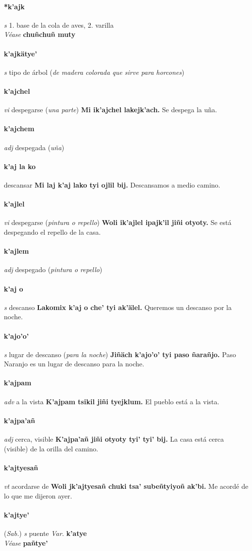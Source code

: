 \documentclass{scrbook}
\newcommand{\entry}[1]{\paragraph{#1}}
\newcommand{\onedefinition}[1]{#1.}
\newcommand{\partofspeech}[1]{\textit{#1}}
\newcommand{\spanishtranslation}[1]{#1}
\newcommand{\clarification}[1]{(\textit{#1})}
\newcommand{\cholexample}[1]{\textbf{#1}}
\newcommand{\exampletranslation}[1]{#1}
\newcommand{\alsosee}[1]{\\\textit{Véase} \textbf{#1}}
\newcommand{\relevantdialect}[1]{(\textit{#1})}
\newcommand{\variation}[1]{\textit{Var.} \textbf{#1}}
\begin{document}
\begin{multicols}{2}
\entry{*k'ajk}
\partofspeech{s}
\onedefinition{1}
\spanishtranslation{base de la cola de aves,}
\onedefinition{2}
\spanishtranslation{varilla}
\alsosee{chuñchuñ muty}

\entry{k'ajkätye'}
\partofspeech{s}
\spanishtranslation{tipo de árbol}
\clarification{de madera colorada que sirve para horcones}

\entry{k'ajchel}
\partofspeech{vi}
\spanishtranslation{despegarse}
\clarification{una parte}
\cholexample{Mi ik'ajchel lakejk'ach.}
\exampletranslation{Se despega la uña.}

\entry{k'ajchem}
\partofspeech{adj}
\spanishtranslation{despegada}
\clarification{uña}

\entry{k'aj la ko}
\spanishtranslation{descansar}
\cholexample{Mi laj k'aj lako tyi ojlil bij.}
\exampletranslation{Descansamos a medio camino.}

\entry{k'ajlel}
\partofspeech{vi}
\spanishtranslation{despegarse}
\clarification{pintura o repello}
\cholexample{Woli ik'ajlel ipajk'il jiñi otyoty.}
\exampletranslation{Se está despegando el repello de la casa.}

\entry{k'ajlem}
\partofspeech{adj}
\spanishtranslation{despegado}
\clarification{pintura o repello}

\entry{k'aj o}
\partofspeech{s}
\spanishtranslation{descanso}
\cholexample{Lakomix k'aj o che' tyi ak'älel.}
\exampletranslation{Queremos un descanso por la noche.}

\entry{k'ajo'o'}
\partofspeech{s}
\spanishtranslation{lugar de descanso}
\clarification{para la noche}
\cholexample{Jiñäch k'ajo'o' tyi paso ñarañjo.}
\exampletranslation{Paso Naranjo es un lugar de descanso para la noche.}

\entry{k'ajpam}
\partofspeech{adv}
\spanishtranslation{a la vista}
\cholexample{K'ajpam tsikil jiñi tyejklum.}
\exampletranslation{El pueblo está a la vista.}

\entry{k'ajpa'añ}
\partofspeech{adj}
\spanishtranslation{cerca, visible}
\cholexample{K'ajpa'añ jiñi otyoty tyi' tyi' bij.}
\exampletranslation{La casa está cerca (visible) de la orilla del camino.}

\entry{k'ajtyesañ}
\partofspeech{vt}
\spanishtranslation{acordarse de}
\cholexample{Woli jk'ajtyesañ chuki tsa' subeñtyiyoñ ak'bi.}
\exampletranslation{Me acordé de lo que me dijeron ayer.}

\entry{k'ajtye'}
\relevantdialect{Sab.}
\partofspeech{s}
\spanishtranslation{puente}
\variation{k'atye}
\alsosee{pañtye'}


\end{multicols}
\end{document}
